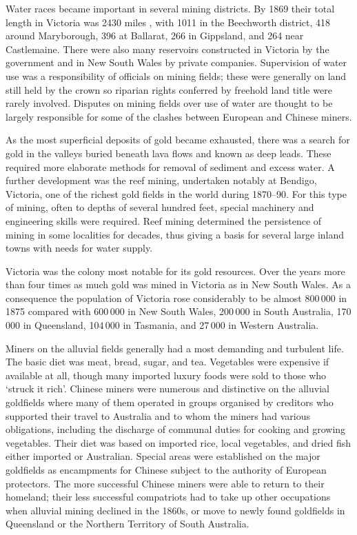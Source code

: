 Water races became important in several mining districts.  By 1869
their total length in Victoria was 2430 miles , with 1011 in the
Beechworth  district, 418 around Maryborough,
 396 at Ballarat,  266 in
Gippsland,  and 264 near Castlemaine.
 There were also many reservoirs
constructed in Victoria by the government and in New South Wales by
private companies.  Supervision of water use was a responsibility of
officials on mining fields; these were generally on land still held by
the crown so riparian rights  conferred by
freehold land title were rarely involved.  Disputes on mining fields
over use of water are thought to be largely responsible for some of
the clashes between European and Chinese 
miners.

As the most superficial deposits of gold became exhausted, there was a
search for gold in the valleys buried beneath lava flows and known as
deep leads.  These required more elaborate methods for removal of
sediment and excess water.  A further development was the reef mining,
undertaken notably at Bendigo,  Victoria, one of the
richest gold fields in the world during 1870--90.  For this type of
mining, often to depths of several hundred feet, special machinery and
engineering skills were required.  Reef mining determined the
persistence of mining in some localities for decades, thus giving a
basis for several large inland towns with needs for water supply.

Victoria was the colony most notable for its gold resources.  Over the
years more than four times as much gold was mined in Victoria as in
New South Wales.  As a consequence the population of Victoria rose
considerably to be almost 800\,000 in 1875 compared with 600\,000 in
New South Wales, 200\,000 in South Australia, 170\,000 in Queensland,
104\,000 in Tasmania, and 27\,000 in Western Australia.

Miners on the alluvial fields generally had a most demanding and
turbulent life.  The basic diet was meat, bread, sugar, and tea.
Vegetables were expensive if available at all, though many imported
luxury foods were sold to those who `struck it rich'.  Chinese miners
were numerous and distinctive on the alluvial goldfields where many of
them operated in groups organised by creditors who supported their
travel to Australia and to whom the miners had various obligations,
including the discharge of communal duties for cooking and growing
vegetables.  Their diet was based on imported rice, local vegetables,
and dried fish either imported or Australian.  Special areas were
established on the major goldfields as encampments for Chinese subject
to the authority of European protectors.  The more successful Chinese
miners were able to return to their homeland; their less successful
compatriots had to take up other occupations when alluvial mining
declined in the 1860s, or move to newly found goldfields in Queensland
or the Northern Territory of South
Australia.

